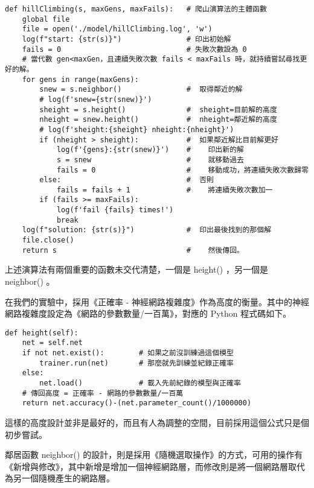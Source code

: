 \documentclass{article}
\begin{document}
\begin{minipage}{\linewidth}
\begin{lstlisting}
def hillClimbing(s, maxGens, maxFails):   # 爬山演算法的主體函數
    global file
    file = open('./model/hillClimbing.log', 'w')
    log(f"start: {str(s)}")               # 印出初始解
    fails = 0                             # 失敗次數設為 0
    # 當代數 gen<maxGen，且連續失敗次數 fails < maxFails 時，就持續嘗試尋找更好的解。
    for gens in range(maxGens):
        snew = s.neighbor()               #  取得鄰近的解
        # log(f'snew={str(snew)}')
        sheight = s.height()              #  sheight=目前解的高度
        nheight = snew.height()           #  nheight=鄰近解的高度
        # log(f'sheight:{sheight} nheight:{nheight}')
        if (nheight > sheight):           #  如果鄰近解比目前解更好
            log(f'{gens}:{str(snew)}')    #    印出新的解
            s = snew                      #    就移動過去
            fails = 0                     #    移動成功，將連續失敗次數歸零
        else:                             #  否則
            fails = fails + 1             #    將連續失敗次數加一
        if (fails >= maxFails):
            log(f'fail {fails} times!')
            break
    log(f"solution: {str(s)}")            #  印出最後找到的那個解
    file.close()
    return s                              #    然後傳回。
\end{lstlisting}
\end{minipage}

上述演算法有兩個重要的函數未交代清楚，一個是 height() ，另一個是 neighbor() 。

在我們的實驗中，採用《正確率 - 神經網路複雜度》作為高度的衡量。其中的神經網路複雜度設定為《網路的參數數量/一百萬》，對應的 Python 程式碼如下。

\begin{minipage}{\linewidth}
\begin{lstlisting}
def height(self):
    net = self.net
    if not net.exist():        # 如果之前沒訓練過這個模型
        trainer.run(net)       # 那麼就先訓練並紀錄正確率
    else:
        net.load()             # 載入先前紀錄的模型與正確率
    # 傳回高度 = 正確率 - 網路的參數數量/一百萬
    return net.accuracy()-(net.parameter_count()/1000000)
\end{lstlisting}
\end{minipage}

這樣的高度設計並非是最好的，而且有人為調整的空間，目前採用這個公式只是個初步嘗試。

鄰居函數 neighbor() 的設計，則是採用《隨機選取操作》的方式，可用的操作有《新增與修改》，其中新增是增加一個神經網路層，而修改則是將一個網路層取代為另一個隨機產生的網路層。
\end{document}
